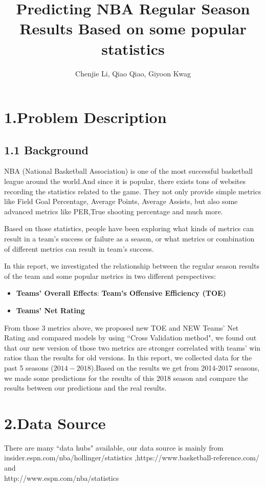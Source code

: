 \documentclass[11pt]{article}
\begin{document}
\title{Predicting NBA Regular Season Results Based on some popular statistics}
\author{Chenjie Li, Qiao Qiao, Giyoon Kwag}
\maketitle
\section*{1.Problem Description}
\subsection*{1.1 Background}
\hspace{1.5em} NBA (National Basketball Association) is one of the most successful basketball league around the world.And since it is popular, there exists tons of websites recording the statistics related to the game. They not only provide simple metrics like Field Goal Percentage,  Average Points, Average Assists, but also some advanced metrics like PER,True shooting percentage and much more.

Based on those statistics, people have been exploring what kinds of metrics can result in a team's success or failure as a season, or what metrics or combination of different metrics can result in team's success.

In this report, we investigated the relationship between the regular season results of the team and some popular metrics in two different perspectives: 
\begin{itemize}
\item \textbf{Teams' Overall Effects}: \textbf{Team's Offensive Efficiency (TOE)}
\item \textbf{Teams' Net Rating}
\end{itemize}
From those 3 metrics above, we proposed new TOE and NEW Teams' Net Rating and compared models by using ``Cross Validation method", we found out that our new version of those two metrics are stronger correlated with teams' win ratios than the results for old versions.
In this report, we collected data for the past 5 seasons ($2014-2018$).Based on the results we get from 2014-2017 seasons, we made some predictions for the results of this 2018 season and compare the results between our predictions and the real results.

\section*{2.Data Source}
\hspace{1.5em} There are many ``data hubs" available, our data source is mainly from \\insider.espn.com/nba/hollinger/statistics ,https://www.basketball-reference.com/ and\\ http://www.espn.com/nba/statistics
\end{document}
